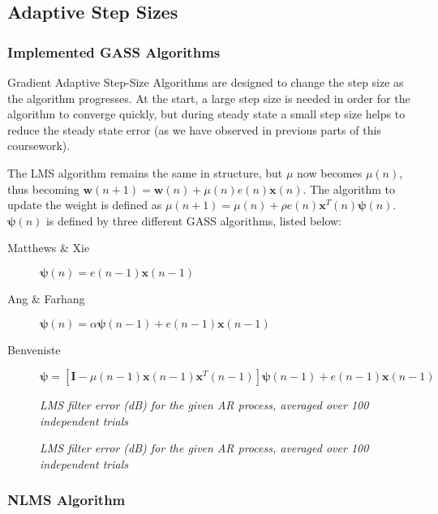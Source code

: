 \documentclass[./main.tex]{subfiles}
\begin{document}
\subsection{Adaptive Step Sizes}

\subsubsection{Implemented GASS Algorithms}
Gradient Adaptive Step-Size Algorithms are designed to change the step size as the algorithm progresses. At the start, a large step size is needed in order for the algorithm to converge quickly, but during steady state a small step size helps to reduce the steady state error (as we have observed in previous parts of this coursework).

The LMS algorithm remains the same in structure, but $\mu$ now becomes $\mu(n)$, thus becoming $  \mathbf{w}(n+1) = \mathbf{w}(n) + \mu(n) e(n) \mathbf{x}(n) $. The algorithm to update the weight is defined as $ \mu(n+1) = \mu(n) + \rho e(n) \mathbf{x}^T(n) \boldsymbol{\psi}(n)$. $ \boldsymbol{\psi}(n) $ is defined by three different GASS algorithms, listed below:

\begin{description}
	\item[Matthews \& Xie] $  \boldsymbol{\psi}(n) = e(n-1) \mathbf{x}(n-1) $
	\item[Ang \& Farhang] $  \boldsymbol{\psi}(n) = \alpha  \boldsymbol{\psi}(n - 1) +  e(n-1) \mathbf{x}(n-1) $
	\item[Benveniste] $ \boldsymbol{\psi} = [ \mathbf{I} - \mu(n-1) \mathbf{x}(n-1) \mathbf{x}^T(n-1)  ] \boldsymbol{\psi}(n - 1) + e(n-1) \mathbf{x}(n-1) $
\end{description}

\begin{figure}[h]
	\centering 
	\resizebox{\textwidth}{!}{}
	\caption{\textit{LMS filter error (dB) for the given AR process, averaged over 100 independent trials}}
	\label{fig:3_2_a_alpha}
\end{figure}

\begin{figure}[h]
	\centering 
	\resizebox{\textwidth}{!}{}
	\caption{\textit{LMS filter error (dB) for the given AR process, averaged over 100 independent trials}}
	\label{fig:3_2_a}
\end{figure}



\subsubsection{NLMS Algorithm}
\end{document}
